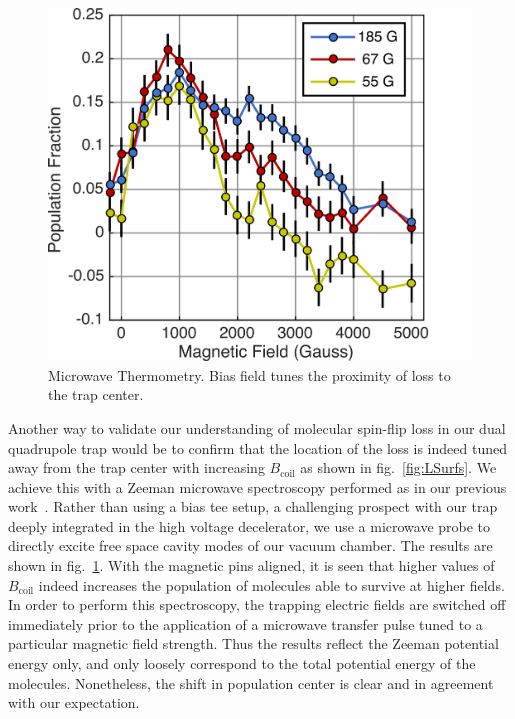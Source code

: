 \documentclass[%
 reprint,
groupedaddress,
 amsmath,amssymb,
 aps,
prl,
]{revtex4-1}
\begin{document}
\begin{figure}[tb]
\includegraphics[width=\linewidth]{MWSpec/MW-therm-dave.png}%
\caption{
Microwave Thermometry. Bias field tunes the proximity of loss to the trap center. 
\label{fig:spec}}
\end{figure}

Another way to validate our understanding of molecular spin-flip loss in our dual quadrupole trap would be to confirm that the location of the loss is indeed tuned away from the trap center with increasing $B_\text{coil}$ as shown in fig.~\ref{fig:LSurfs}. We achieve this with a Zeeman microwave spectroscopy performed as in our previous work~\cite{Stuhl2012evap}. Rather than using a bias tee setup, a challenging prospect with our trap deeply integrated in the high voltage decelerator, we use a microwave probe to directly excite free space cavity modes of our vacuum chamber. The results are shown in fig.~\ref{fig:spec}. With the magnetic pins aligned, it is seen that higher values of $B_{\text{coil}}$ indeed increases the population of molecules able to survive at higher fields. In order to perform this spectroscopy, the trapping electric fields are switched off immediately prior to the application of a microwave transfer pulse tuned to a particular magnetic field strength. Thus the results reflect the Zeeman potential energy only, and only loosely correspond to the total potential energy of the molecules. Nonetheless, the shift in population center is clear and in agreement with our expectation.  %
\end{document}
